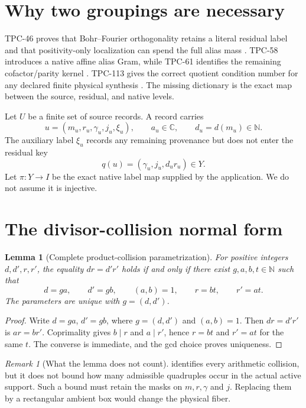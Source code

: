\documentclass[11pt]{article}
\newtheorem{lemma}[theorem]{Lemma}
\theoremstyle{definition}
\theoremstyle{remark}
\newtheorem{remark}[theorem]{Remark}
\newcommand{\C}{\mathbb C}
\begin{document}
\section{Why two groupings are necessary}

TPC-46 proves that Bohr--Fourier orthogonality retains a literal
residual label and that positivity-only localization can spend the
full alias mass \citep{WangTPC46}.  TPC-58 introduces a native affine
alias Gram, while TPC-61 identifies the remaining cofactor/parity
kernel \citep{WangTPC58,WangTPC61}.  TPC-113 gives the correct
quotient condition number for any declared finite physical synthesis
\citep{WangTPC113}.  The missing dictionary is the exact map between
the source, residual, and native levels.

Let \(U\) be a finite set of source records.  A record carries
\[
 u=(m_u,r_u,\gamma_u,j_u,\xi_u),\qquad
 a_u\in\C,\qquad d_u=d(m_u)\in\mathbb N.
\]
The auxiliary label \(\xi_u\) records any remaining provenance but
does not enter the residual key
\[
 q(u)=(\gamma_u,j_u,d_ur_u)\in Y.
\]
Let \(\pi:Y\to I\) be the exact native label map supplied by the
application.  We do not assume it is injective.

\section{The divisor-collision normal form}

\begin{lemma}[Complete product-collision parametrization]
\label{lem:collision}
For positive integers \(d,d',r,r'\), the equality \(dr=d'r'\) holds
if and only if there exist \(g,a,b,t\in\mathbb N\) such that
\[
 d=ga,\qquad d'=gb,\qquad (a,b)=1,\qquad
 r=bt,\qquad r'=at.
\]
The parameters are unique with
\(g=(d,d')\).
\end{lemma}

\begin{proof}
Write \(d=ga\), \(d'=gb\), where \(g=(d,d')\) and \((a,b)=1\).
Then \(dr=d'r'\) is \(ar=br'\).  Coprimality gives \(b\mid r\)
and \(a\mid r'\), hence \(r=bt\) and \(r'=at\) for the same \(t\).
The converse is immediate, and the gcd choice proves uniqueness.
\end{proof}

\begin{remark}[What the lemma does not count]
 identifies every arithmetic collision, but it
does not bound how many admissible quadruples occur in the actual
active support.  Such a bound must retain the masks on \(m,r,\gamma\)
and \(j\).  Replacing them by a rectangular ambient box would change
the physical fiber.
\end{remark}
\end{document}
